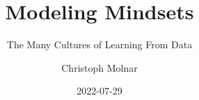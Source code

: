 \documentclass[
  10pt,
]{scrbook}
\title{Modeling Mindsets}
\subtitle{The Many Cultures of Learning From Data}
\author{Christoph Molnar}
\date{2022-07-29}
\begin{document}
\maketitle

\let\oldhref\href
\renewcommand{\href}[2]{#2\footnote{\url{#1}}}




\thispagestyle{empty}

\end{document}
